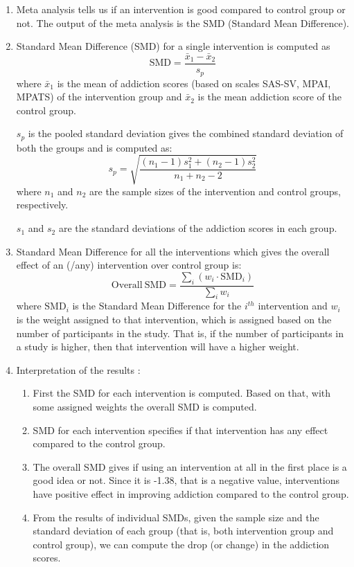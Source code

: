 \documentclass{article}
\begin{document}
\begin{enumerate}
    \textbf{UPDATE : }

    \item \label{sec:SAS-SV_Update} Meta analysis tells us if an intervention is good compared to control group or not. The output of the meta analysis is the SMD (Standard Mean Difference).
    \item Standard Mean Difference (SMD) for a single intervention is computed as 
    \[
        \mathrm{SMD} = \frac{\bar{x}_1 - \bar{x}_2}{s_p}
    \]
    where $\bar{x}_1$ is the mean of addiction scores (based on scales SAS-SV, MPAI, MPATS) of the intervention group and $\bar{x}_2$ is the mean addiction score of the control group. 
    
    $s_p$ is the pooled standard deviation gives the combined standard deviation of both the groups and is computed as:
    \[
        s_p = \sqrt{
        \frac{(n_1 - 1)s_1^2 + (n_2 - 1)s_2^2}
        {n_1 + n_2 - 2}
        }
    \]
    where $n_1$ and $n_2$ are the sample sizes of the intervention and control groups, respectively.
    
    $s_1$ and $s_2$ are the standard deviations of the addiction scores in each group.

    \item Standard Mean Difference for all the interventions which gives the overall effect of an (/any) intervention over control group is: 
    \[
        \mathrm{Overall\ SMD} =
        \frac{\sum_{i} (w_i \cdot \mathrm{SMD}_i)}
        {\sum_{i} w_i}
    \]
    where $\mathrm{SMD}_i$ is the Standard Mean Difference for the $i^{th}$ intervention and $w_i$ is the weight assigned to that intervention, which is assigned based on the number of participants in the study. That is, if the number of participants in a study is higher, then that intervention will have a higher weight.
    \item Interpretation of the results :
    \begin{enumerate}
        \item First the SMD for each intervention is computed. Based on that, with some assigned weights the overall SMD is computed.
        \item SMD for each intervention specifies if that intervention has any effect compared to the control group.
        \item The overall SMD gives if using an intervention at all in the first place is a good idea or not.
        Since it is -1.38, that is a negative value, interventions have positive effect in improving addiction compared to the control group.
        \item From the results of individual SMDs, given the sample size and the standard deviation of each group (that is, both intervention group and control group), we can compute the drop (or change) in the addiction scores.
        

\end{enumerate}
\end{enumerate}
\end{document}
